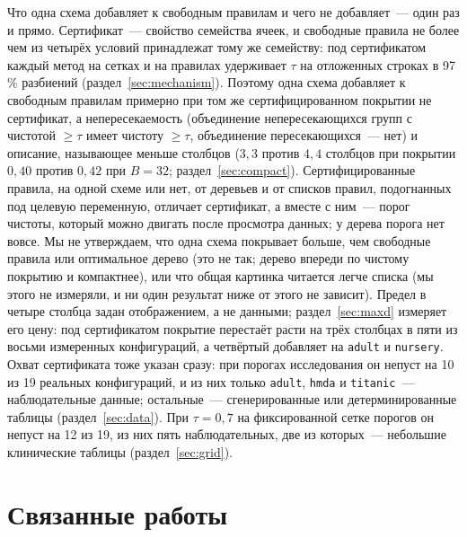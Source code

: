\documentclass[11pt]{article}
\begin{document}
Что одна схема добавляет к свободным правилам и чего не добавляет~--- один раз и прямо. Сертификат~--- свойство семейства ячеек, и свободные правила не более чем из четырёх условий принадлежат тому же семейству: под сертификатом каждый метод на сетках и на правилах удерживает $\tau$ на отложенных строках в 97\,\% разбиений (раздел~\ref{sec:mechanism}). Поэтому одна схема добавляет к свободным правилам примерно при том же сертифицированном покрытии не сертификат, а непересекаемость (объединение непересекающихся групп с чистотой $\ge\tau$ имеет чистоту $\ge\tau$, объединение пересекающихся~--- нет) и описание, называющее меньше столбцов ($3{,}3$ против $4{,}4$ столбцов при покрытии $0{,}40$ против $0{,}42$ при $B=32$; раздел~\ref{sec:compact}). Сертифицированные правила, на одной схеме или нет, от деревьев и от списков правил, подогнанных под целевую переменную, отличает сертификат, а вместе с ним~--- порог чистоты, который можно двигать после просмотра данных; у дерева порога нет вовсе. Мы не утверждаем, что одна схема покрывает больше, чем свободные правила или оптимальное дерево (это не так; дерево впереди по чистому покрытию и компактнее), или что общая картинка читается легче списка (мы этого не измеряли, и ни один результат ниже от этого не зависит). Предел в четыре столбца задан отображением, а не данными; раздел~\ref{sec:maxd} измеряет его цену: под сертификатом покрытие перестаёт расти на трёх столбцах в пяти из восьми измеренных конфигураций, а четвёртый добавляет на \texttt{adult} и \texttt{nursery}. Охват сертификата тоже указан сразу: при порогах исследования он непуст на 10 из 19 реальных конфигураций, и из них только \texttt{adult}, \texttt{hmda} и \texttt{titanic}~--- наблюдательные данные; остальные~--- сгенерированные или детерминированные таблицы (раздел~\ref{sec:data}). При $\tau=0{,}7$ на фиксированной сетке порогов он непуст на 12 из 19, из них пять наблюдательных, две из которых~--- небольшие клинические таблицы (раздел~\ref{sec:grid}).

\section{Связанные работы}\label{sec:related}
\end{document}
